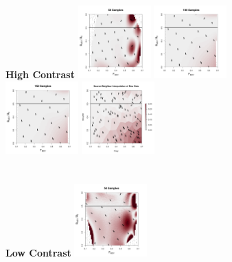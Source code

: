 \begin{figure} 
\begin{center}
\textbf{High Contrast}
\includegraphics[width=0.25\textwidth]{../edits/directionalBiasSubPTExpT45MinConnF1.png}%
\includegraphics[width=0.25\textwidth]{../edits/directionalBiasSubPTExpT45MinCon.png}%
\includegraphics[width=0.25\textwidth]{../edits/directionalBiasSubPTExpT45MinCon2X.png}%
\includegraphics[width=0.25\textwidth]{../edits/obsDirectionalBiasSubExpT45MinCon2X.png}
\\$~$\\$~$\\
\textbf{Low Contrast}
\includegraphics[width=0.25\textwidth]{../edits/directionalBiasSubPTFlatT30nF6.png}%

\end{center}
\end{figure}
